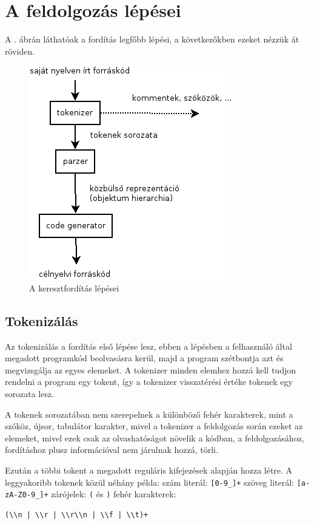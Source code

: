 
\section{A feldolgozás lépései}

A . ábrán láthatóak a fordítás legfőbb lépési, a következőkben ezeket nézzük át röviden.

\begin{figure}
\centering
\includegraphics[scale=1]{kepek/process.png}
\caption{A keresztfordítás lépései}
\label{fig:process}
\end{figure}

\subsection{Tokenizálás}

Az tokenizálás a fordítás első lépése lesz, ebben a lépésben a felhasználó által megadott programkód beolvasásra kerül, majd a program szétbontja azt és megvizsgálja az egyes elemeket. A tokenizer minden elemhez hozzá kell tudjon rendelni a program egy tokent, így a tokenizer visszatérési értéke tokenek egy sorozata lesz.

A tokenek sorozatában nem szerepelnek a különböző fehér karakterek, mint a szóköz, újsor, tabulátor karakter, mivel a tokenizer a feldolgozás során ezeket az elemeket, mivel ezek csak az olvashatóságot növelik a kódban, a feldolgozásához, fordításhoz plusz információval nem járulnak hozzá, törli.

Ezután a többi tokent a megadott reguláris kifejezések alapján hozza létre. A leggyakoribb tokenek közül néhány példa:
szám literál: \texttt{[0-9\_]+}
szöveg literál: \texttt{[a-zA-Z0-9\_]+}
zárójelek: \texttt{(} és \texttt{)}
fehér karakterek:
\begin{verbatim}
(\\n | \\r | \\r\\n | \\f | \\t)+
\end{verbatim}

